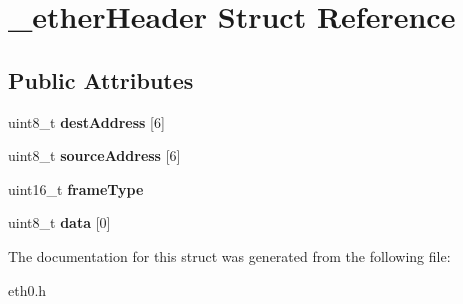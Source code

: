 \hypertarget{struct__etherHeader}{}\section{\+\_\+ether\+Header Struct Reference}
\label{struct__etherHeader}
\subsection*{Public Attributes}
\begin{DoxyCompactItemize}
\item 
\mbox{\label{struct__etherHeader_a92143e6946b3c56fcbbc1713a8afa7e0}} 
uint8\+\_\+t {\bfseries dest\+Address} \mbox{[}6\mbox{]}
\item 
\mbox{\label{struct__etherHeader_a20b851de2e0073e9d27776edbd3e75c5}} 
uint8\+\_\+t {\bfseries source\+Address} \mbox{[}6\mbox{]}
\item 
\mbox{\label{struct__etherHeader_a2b501a1791fcbfa944fe6f696e874f95}} 
uint16\+\_\+t {\bfseries frame\+Type}
\item 
\mbox{\label{struct__etherHeader_af31a6161fbb6364ac4a0c5c158d42dec}} 
uint8\+\_\+t {\bfseries data} \mbox{[}0\mbox{]}
\end{DoxyCompactItemize}


The documentation for this struct was generated from the following file\+:\begin{DoxyCompactItemize}
\item 
eth0.\+h\end{DoxyCompactItemize}
